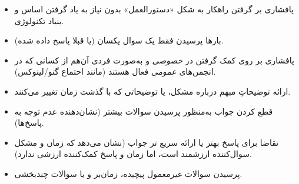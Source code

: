 \begin{itemize}
\item
پافشاری بر گرفتن راهکار به شکل «دستورالعمل» بدون نیاز
به یاد گرفتن اساس و بنیاد تکنولوژی.

\item
بارها پرسیدن فقط یک سوال یکسان (یا قبلا پاسخ داده شده).

\item
پافشاری بر روی کمک گرفتن در {\itshape خصوصی} و به‌صورت فردی
آن‌هم از کسانی که در انجمن‌های {\itshape عمومی} فعال هستند
(مانند احتماع گنو/لینوکس).

\item
ارائه توضیحاتِ مبهم درباره مشکل، یا توضیحاتی که با گذشت زمان تغییر می‌کنند.

\item
قطع کردن جواب به‌منظور پرسیدن سوالات بیشتر
(نشان‌دهنده عدم توجه به پاسخ‌ها).

\item
تقاضا برای پاسخ بهتر یا ارائه سریع تر جواب (نشان می‌دهد
که زمان و مشکل سوال‌کننده ارزشمند است، اما زمان و پاسخ
کمک‌کننده ارزشی ندارد).

\item
پرسیدن سوالات غیرمعمول پیچیده، زمان‌بر و یا سوالات چندبخشی.
\end{itemize}

